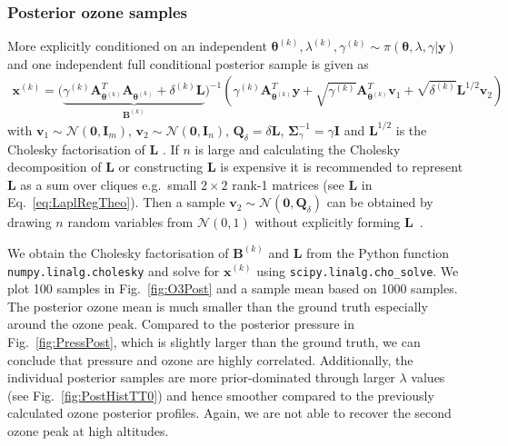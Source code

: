 \subsubsection{Posterior ozone samples}
More explicitly conditioned on an independent $\bm{\theta}^{(k)},\lambda^{(k)},\gamma^{(k)} \sim \pi(\bm{\theta},\lambda,\gamma | \bm{y})$ and one independent full conditional posterior sample is given as  
\begin{align}
	\label{eq:RTOAppl}
	\bm{x}^{(k)} = 	\Big(  \underbrace{\gamma^{(k)} \bm{A}_{\bm{\theta}^{(k)}}^T\bm{A}_{\bm{\theta}^{(k)}} +  \delta^{(k)}\bm{L}}_{\bm{B}^{(k)}} \Big)^{-1} \left(  \gamma^{(k)}  \bm{A}_{\bm{\theta}^{(k)}}^T\bm{y} +\sqrt{\gamma^{(k)}} \bm{A}_{\bm{\theta}^{(k)}}^T \bm{v}_1 + \sqrt{\delta^{(k)}}\bm{L}^{1/2}\bm{v}_2\right)
\end{align}
with $\bm{v}_1 \sim \mathcal{N}(\bm{0},  \bm{I}_m )$, $\bm{v}_2 \sim \mathcal{N}(\bm{0}, \bm{I}_n )$, $\bm{Q}_{\delta} = \delta  \bm{L} $, $\bm{\Sigma}^{-1}_{\gamma} = \gamma \bm{I}$  and $\bm{L}^{1/2}$ is the Cholesky factorisation of $\bm{L}$ \cite{bardsley2012mcmc}.
If $n$ is large and calculating the Cholesky decomposition of $\bm{L}$ or constructing $\bm{L}$ is expensive it is recommended to represent $\bm{L}$ as a sum over cliques e.g.~small $2\times2$ rank-1 matrices (see $\bm{L}$ in Eq.~\ref{eq:LaplRegTheo}).
Then a sample $\bm{v}_2 \sim \mathcal{N}(\bm{0}, \bm{Q}_{\delta})$ can be obtained by drawing $n$ random variables from $\mathcal{N}(0,1)$ without explicitly forming $\bm{L}$~\cite{fox2016fast}.

We obtain the Cholesky factorisation of $\bm{B}^{(k)}$ and $\bm{L}$ from the Python function \texttt{numpy.linalg.cholesky} and 
solve for $\bm{x}^{(k)}$ using \texttt{scipy.linalg.cho\_solve}.
We plot 100 samples in Fig.~\ref{fig:O3Post} and a sample mean based on 1000 samples.
The posterior ozone mean is much smaller than the ground truth especially around the ozone peak.
Compared to the posterior pressure in Fig.~\ref{fig:PressPost}, which is slightly larger than the ground truth, we can conclude that pressure and ozone are highly correlated.
Additionally, the individual posterior samples are more prior-dominated through larger $\lambda$ values (see Fig.~\ref{fig:PostHistTT0}) and hence smoother compared to the previously calculated ozone posterior profiles.
Again, we are not able to recover the second ozone peak at high altitudes.



